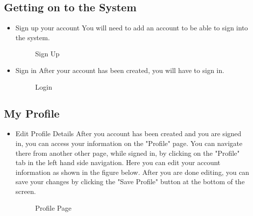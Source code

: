 \subsection{Getting on to the System}
\begin{itemize}
	\item{Sign up your account}
	\newline
	You will need to add an account to be able to sign into the system.
	\begin{figure}[H]
	    	\centering
	    	\caption{Sign Up}
	    	\label{fig:Learning rate 0.1}
   	\end{figure}
	\item{Sign in}
	\newline
	After your account has been created, you will have to sign in.
	\begin{figure}[H]
	    	\centering
	    	\caption{Login}
	    	\label{fig:Learning rate 0.1}
   	\end{figure}
\end{itemize}
\subsection{My Profile}
\begin{itemize}
	\item{Edit Profile Details}
	\newline
	After you account has been created and you are signed in, you can access your information on the "Profile" page. You can navigate there from another other page, while signed in, by clicking on the "Profile" tab in the left hand side navigation. Here you can edit your account information as shown in the figure below. After you are done editing, you can save your changes by clicking the "Save Profile" button at the bottom of the screen.
	\begin{figure}[H]
	    	\centering
	    	\caption{Profile Page}
	    	\label{fig:Learning rate 0.1}
   	\end{figure}
\end{itemize}